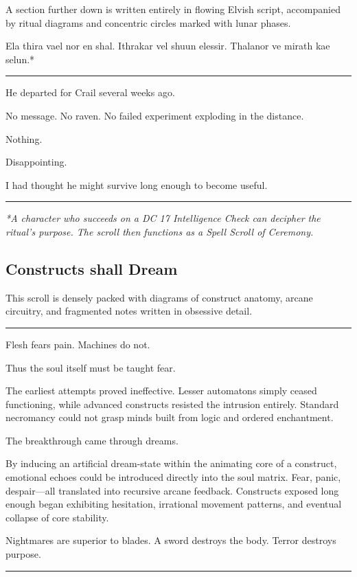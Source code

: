{\entryfont A section further down is written entirely in flowing Elvish script, accompanied by ritual diagrams and concentric circles marked with lunar phases.}

{\elvishfont Ela thira vael nor en shal. Ithrakar vel shuun elessir. Thalanor ve mirath kae selun.}*

\noindent\rule{\linewidth}{0.4pt}

{\entryfont He departed for Crail several weeks ago.

No message. No raven. No failed experiment exploding in the distance.

Nothing.

Disappointing.

I had thought he might survive long enough to become useful.}

\noindent\rule{\linewidth}{0.6pt}

\textit{*A character who succeeds on a DC 17 Intelligence Check can decipher the ritual's purpose. The scroll then functions as a Spell Scroll of Ceremony.}
\vfill\eject
\subsection*{Constructs shall Dream}
This scroll is densely packed with diagrams of construct anatomy, arcane circuitry, and fragmented notes written in obsessive detail.

\noindent\rule{\linewidth}{0.6pt}

{\entryfont Flesh fears pain. Machines do not.

Thus the soul itself must be taught fear.

The earliest attempts proved ineffective. Lesser automatons simply ceased functioning, while advanced constructs resisted the intrusion entirely. Standard necromancy could not grasp minds built from logic and ordered enchantment.

The breakthrough came through dreams.

By inducing an artificial dream-state within the animating core of a construct, emotional echoes could be introduced directly into the soul matrix. Fear, panic, despair—all translated into recursive arcane feedback. Constructs exposed long enough began exhibiting hesitation, irrational movement patterns, and eventual collapse of core stability.

Nightmares are superior to blades. A sword destroys the body. Terror destroys purpose.}

\noindent\rule{\linewidth}{0.6pt}

